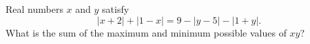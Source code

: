 Real numbers $x$ and $y$ satisfy
\[
|x+2|+|1-x|=9-|y-5|-|1+y| .
\]
What is the sum of the maximum and minimum possible values of $xy$?
